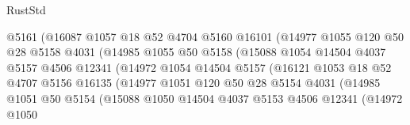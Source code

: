 \begin{lexlean}{RustStd}
\begin{coremodule}
                              @5161
                              (@16087
                                @1057
                                @18
                                @52
                                @4704
                                @5160
                                @16101
                                (@14977
                                  @1055
                                  @120
                                  @50
                                  @28
                                  @5158
                                  @4031
                                  (@14985
                                    @1055
                                    @50
                                    @5158
                                    (@15088
                                      @1054
                                      @14504
                                      @4037
                                      @5157
                                      @4506
                                      @12341
                                      (@14972
                                        @1054
                                        @14504
                                        @5157
                                        (@16121
                                          @1053
                                          @18
                                          @52
                                          @4707
                                          @5156
                                          @16135
                                          (@14977
                                            @1051
                                            @120
                                            @50
                                            @28
                                            @5154
                                            @4031
                                            (@14985
                                              @1051
                                              @50
                                              @5154
                                              (@15088
                                                @1050
                                                @14504
                                                @4037
                                                @5153
                                                @4506
                                                @12341
                                                (@14972
                                                  @1050

\end{coremodule}
\end{lexlean}
